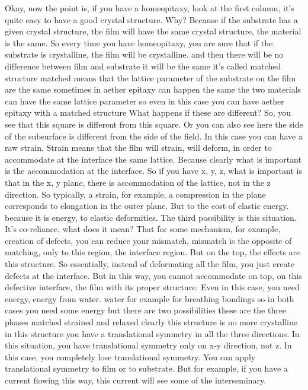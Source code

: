 Okay, now the point is, if you have a homeopitaxy, look at the first column, it's quite easy to have a good crystal structure. Why? Because if the substrate has a given crystal structure, the film will have the same crystal structure, the material is the same. So every time you have homeopitaxy, you are sure that if the substrate is crystalline, the film will be crystalline. and then there will be no difference between film and substrate it will be the same it's called matched structure matched means that the lattice parameter of the substrate on the film are the same sometimes in aether epitaxy can happen the same the two materials can have the same lattice parameter so even in this case you can have aether epitaxy with a matched structure What happens if these are different? So, you see that this square is different from this square. Or you can also see here the side of the subsurface is different from the side of the field. In this case you can have a raw strain. Strain means that the film will strain, will deform, in order to accommodate at the interface the same lattice. Because clearly what is important is the accommodation at the interface. So if you have x, y, z, what is important is that in the x, y plane, there is accommodation of the lattice, not in the z direction. So typically, a strain, for example, a compression in the plane corresponds to elongation in the outer plane. But to the cost of elastic energy. because it is energy, to elastic deformities. The third possibility is this situation. It's co-reliance, what does it mean? That for some mechanism, for example, creation of defects, you can reduce your mismatch, mismatch is the opposite of matching, only to this region, the interface region. But on the top, the effects are this structure. So essentially, instead of deformating all the film, you just create defects at the interface. But in this way, you cannot accommodate on top, on this defective interface, the film with its proper structure. Even in this case, you need energy, energy from water. water for example for breathing bondings so in both cases you need some energy but there are two possibilities these are the three phases matched strained and relaxed clearly this structure is no more crystalline in this structure you have a translational symmetry in all the three directions. In this situation, you have translational symmetry only on x-y direction, not z. In this case, you completely lose translational symmetry. You can apply translational symmetry to film or to substrate. But for example, if you have a current flowing this way, this current will see some of the interseminary.
